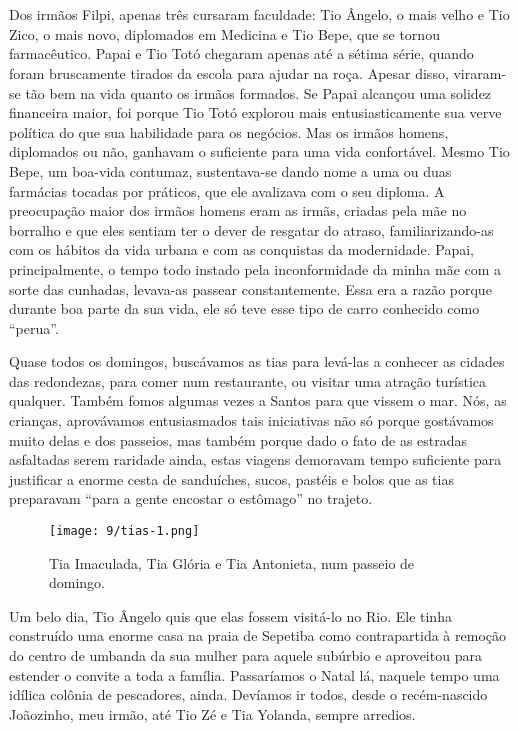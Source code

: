 \chapter{}
Dos irmãos Filpi, apenas três cursaram faculdade: Tio Ângelo, o mais velho e Tio Zico, o mais novo, diplomados em Medicina e Tio Bepe, que se tornou farmacêutico.
Papai e Tio Totó chegaram apenas até a sétima série, quando foram bruscamente tirados da escola para ajudar na roça.
Apesar disso, viraram-se tão bem na vida quanto os irmãos formados.
Se Papai alcançou uma solidez financeira maior, foi porque Tio Totó explorou mais entusiasticamente sua verve política do que sua habilidade para os negócios.
Mas os irmãos homens, diplomados ou não, ganhavam o suficiente para uma vida confortável.
Mesmo Tio Bepe, um boa-vida contumaz, sustentava-se dando nome a uma ou duas farmácias tocadas por práticos, que ele avalizava com o seu diploma.
A preocupação maior dos irmãos homens eram as irmãs, criadas pela mãe no borralho e que eles sentiam ter o dever de resgatar do atraso, familiarizando-as com os hábitos da vida urbana e com as conquistas da modernidade.
Papai, principalmente, o tempo todo instado pela inconformidade da minha mãe com a sorte das cunhadas, levava-as passear constantemente.
Essa era a razão porque durante boa parte da sua vida, ele só teve esse tipo de carro conhecido como ``perua''.


Quase todos os domingos, buscávamos as tias para levá-las a conhecer as cidades das redondezas, para comer num restaurante, ou visitar uma atração turística qualquer.
Também fomos algumas vezes a Santos para que vissem o mar.
Nós, as crianças, aprovávamos entusiasmados tais iniciativas não só porque gostávamos muito delas e dos passeios, mas também porque dado o fato de as estradas asfaltadas serem raridade ainda, estas viagens demoravam tempo suficiente para justificar a enorme cesta de sanduíches, sucos, pastéis e bolos que as tias preparavam ``para a gente encostar o estômago'' no trajeto.

\begin{figure}[H]
\centering
\texttt{[image: 9/tias-1.png]}
\caption{Tia Imaculada, Tia Glória e Tia Antonieta, num passeio de domingo.}
\end{figure}

Um belo dia, Tio Ângelo quis que elas fossem visitá-lo no Rio.
Ele tinha construído uma enorme casa na praia de Sepetiba como contrapartida à remoção do centro de umbanda da sua mulher para aquele subúrbio e aproveitou para estender o convite a toda a família.
Passaríamos o Natal lá, naquele tempo uma idílica colônia de pescadores, ainda.
Devíamos ir todos, desde o recém-nascido Joãozinho, meu irmão, até Tio Zé e Tia Yolanda, sempre arredios.


